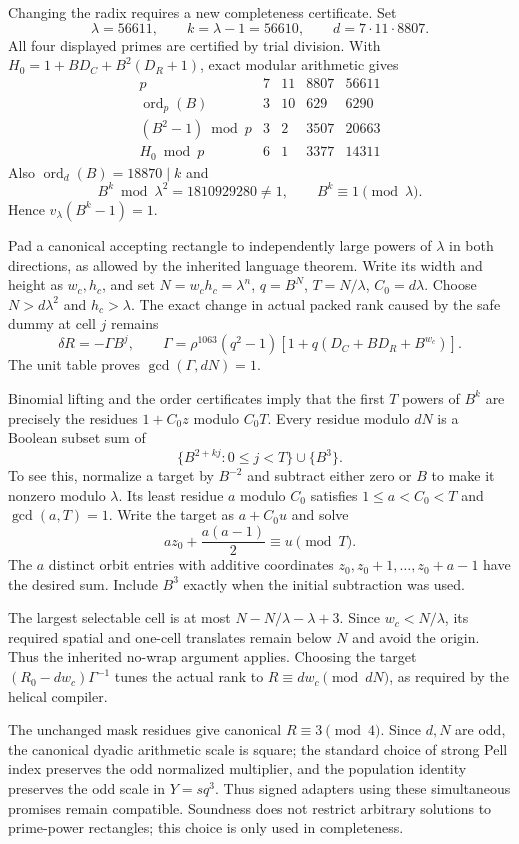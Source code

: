 Changing the radix requires a new completeness certificate.  Set
\[
 \lambda=56611,\qquad k=\lambda-1=56610,
 \qquad d=7\cdot11\cdot8807.
\]
All four displayed primes are certified by trial division.  With
$H_0=1+BD_C+B^2(D_R+1)$, exact modular arithmetic gives
\[
\begin{array}{c|rrrr}
 p&7&11&8807&56611\\\hline
 \operatorname{ord}_p(B)&3&10&629&6290\\
 (B^2-1)\bmod p&3&2&3507&20663\\
 H_0\bmod p&6&1&3377&14311
\end{array}
\]
Also $\operatorname{ord}_d(B)=18870\mid k$ and
\[
 B^k\bmod\lambda^2=1810929280\ne1,
 \qquad B^k\equiv1\pmod\lambda.
\]
Hence $v_\lambda(B^k-1)=1$.

Pad a canonical accepting rectangle to independently large powers of
$\lambda$ in both directions, as allowed by the inherited language
theorem.  Write its width and height as $w_c,h_c$, and set
$N=w_ch_c=\lambda^n$, $q=B^N$, $T=N/\lambda$, $C_0=d\lambda$.
Choose $N>d\lambda^2$ and $h_c>\lambda$.
The exact change in actual packed rank caused by the safe dummy at cell
$j$ remains
\[
 \delta R=-\Gamma B^j,\qquad
 \Gamma=\rho^{1063}(q^2-1)
          [1+q(D_C+BD_R+B^{w_c})].
\]
The unit table proves $\gcd(\Gamma,dN)=1$.

Binomial lifting and the order certificates imply that the first $T$
powers of $B^k$ are precisely the residues $1+C_0z$ modulo $C_0T$.
Every residue modulo $dN$ is a Boolean subset sum of
\[
 \{B^{2+kj}:0\le j<T\}\cup\{B^3\}.
\]
To see this, normalize a target by $B^{-2}$ and subtract either zero or
$B$ to make it nonzero modulo $\lambda$.  Its least residue $a$ modulo
$C_0$ satisfies $1\le a<C_0<T$ and $\gcd(a,T)=1$.  Write the target as
$a+C_0u$ and solve
\[
 az_0+\frac{a(a-1)}2\equiv u\pmod T.
\]
The $a$ distinct orbit entries with additive coordinates
$z_0,z_0+1,\ldots,z_0+a-1$ have the desired sum.  Include $B^3$ exactly
when the initial subtraction was used.

The largest selectable cell is at most $N-N/\lambda-\lambda+3$.
Since $w_c<N/\lambda$, its required spatial and one-cell translates
remain below $N$ and avoid the origin.  Thus the inherited no-wrap
argument applies.  Choosing the target
$(R_0-dw_c)\Gamma^{-1}$ tunes the actual rank to
$R\equiv dw_c\pmod{dN}$, as required by the helical compiler.

The unchanged mask residues give canonical $R\equiv3\pmod4$.
Since $d,N$ are odd, the canonical dyadic arithmetic scale is square;
the standard choice of strong Pell index preserves the odd normalized
multiplier, and the population identity preserves the odd scale in
$Y=sq^3$.  Thus signed adapters using these simultaneous promises remain
compatible.  Soundness does not restrict arbitrary solutions to
prime-power rectangles; this choice is only used in completeness.

